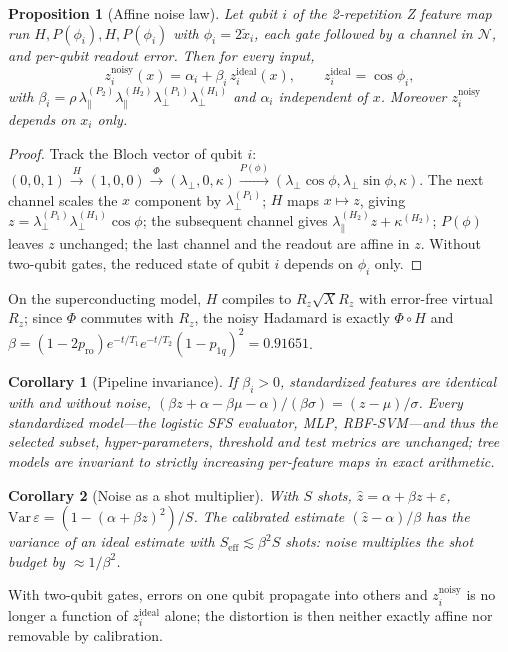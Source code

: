 \documentclass[conference,compsoc]{IEEEtran}
\newtheorem{proposition}{Proposition}
\newtheorem{corollary}{Corollary}
\begin{document}
\begin{proposition}[Affine noise law]
Let qubit $i$ of the 2-repetition Z feature map run $H,P(\phi_i),H,P(\phi_i)$ with $\phi_i=2\tilde x_i$, each gate followed by a channel in $\mathcal{N}$, and per-qubit readout error. Then for every input,
\begin{equation}
z_i^{\mathrm{noisy}}(x)=\alpha_i+\beta_i\,z_i^{\mathrm{ideal}}(x),\qquad z_i^{\mathrm{ideal}}=\cos\phi_i,
\end{equation}
with $\beta_i=\rho\,\lambda_\parallel^{(P_2)}\lambda_\parallel^{(H_2)}\lambda_\perp^{(P_1)}\lambda_\perp^{(H_1)}$ and $\alpha_i$ independent of $x$. Moreover $z_i^{\mathrm{noisy}}$ depends on $x_i$ only.
\end{proposition}
\begin{proof}
Track the Bloch vector of qubit $i$: $(0,0,1)\xrightarrow{H}(1,0,0)\xrightarrow{\Phi}(\lambda_\perp,0,\kappa)\xrightarrow{P(\phi)}(\lambda_\perp\cos\phi,\lambda_\perp\sin\phi,\kappa)$. The next channel scales the $x$ component by $\lambda_\perp^{(P_1)}$; $H$ maps $x\mapsto z$, giving $z=\lambda_\perp^{(P_1)}\lambda_\perp^{(H_1)}\cos\phi$; the subsequent channel gives $\lambda_\parallel^{(H_2)}z+\kappa^{(H_2)}$; $P(\phi)$ leaves $z$ unchanged; the last channel and the readout are affine in $z$. Without two-qubit gates, the reduced state of qubit $i$ depends on $\phi_i$ only.
\end{proof}
On the superconducting model, $H$ compiles to $R_z\sqrt{X}R_z$ with error-free virtual $R_z$; since $\Phi$ commutes with $R_z$, the noisy Hadamard is exactly $\Phi\circ H$ and $\beta=(1-2p_{\mathrm{ro}})e^{-t/T_1}e^{-t/T_2}(1-p_{1q})^2=0.91651$.

\begin{corollary}[Pipeline invariance]
If $\beta_i>0$, standardized features are identical with and without noise, $(\beta z+\alpha-\beta\mu-\alpha)/(\beta\sigma)=(z-\mu)/\sigma$. Every standardized model---the logistic SFS evaluator, MLP, RBF-SVM---and thus the selected subset, hyper-parameters, threshold and test metrics are unchanged; tree models are invariant to strictly increasing per-feature maps in exact arithmetic.
\end{corollary}
\begin{corollary}[Noise as a shot multiplier]
With $S$ shots, $\hat z=\alpha+\beta z+\varepsilon$, $\mathrm{Var}\,\varepsilon=(1-(\alpha+\beta z)^2)/S$. The calibrated estimate $(\hat z-\alpha)/\beta$ has the variance of an ideal estimate with $S_{\mathrm{eff}}\lesssim\beta^2S$ shots: noise multiplies the shot budget by $\approx1/\beta^2$.
\end{corollary}
With two-qubit gates, errors on one qubit propagate into others and $z_i^{\mathrm{noisy}}$ is no longer a function of $z_i^{\mathrm{ideal}}$ alone; the distortion is then neither exactly affine nor removable by calibration.
\end{document}
